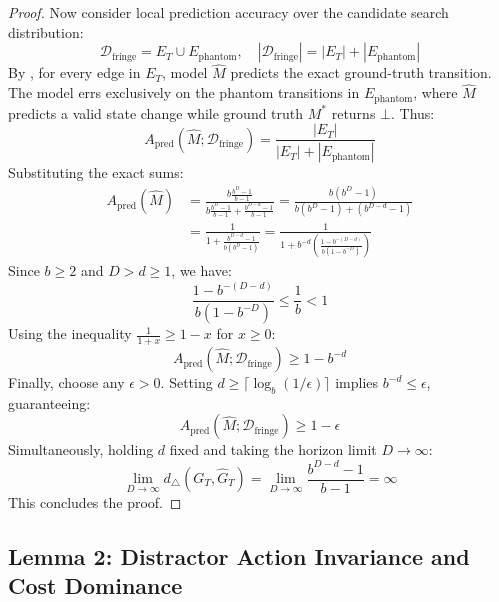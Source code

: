 \documentclass[11pt,a4paper]{article}
\theoremstyle{definition}
\theoremstyle{remark}
\begin{document}
\begin{proof}
Now consider local prediction accuracy over the candidate search distribution:
\begin{equation}
    \mathcal{D}_{\text{fringe}} = E_T \cup E_{\text{phantom}}, \quad |\mathcal{D}_{\text{fringe}}| = |E_T| + |E_{\text{phantom}}|
\end{equation}
By , for every edge in $E_T$, model $\widehat{M}$ predicts the exact ground-truth transition. The model errs exclusively on the phantom transitions in $E_{\text{phantom}}$, where $\widehat{M}$ predicts a valid state change while ground truth $M^*$ returns $\bot$.
Thus:
\begin{equation}
    A_{\text{pred}}(\widehat{M}; \mathcal{D}_{\text{fringe}}) = \frac{|E_T|}{|E_T| + |E_{\text{phantom}}|}
\end{equation}
Substituting the exact sums:
\begin{align}
    A_{\text{pred}}(\widehat{M}) &= \frac{b \frac{b^D - 1}{b - 1}}{b \frac{b^D - 1}{b - 1} + \frac{b^{D-d} - 1}{b - 1}} = \frac{b(b^D - 1)}{b(b^D - 1) + (b^{D-d} - 1)} \\
    &= \frac{1}{1 + \frac{b^{D-d} - 1}{b(b^D - 1)}} = \frac{1}{1 + b^{-d} \left( \frac{1 - b^{-(D-d)}}{b(1 - b^{-D})} \right)}
\end{align}
Since $b \ge 2$ and $D > d \ge 1$, we have:
\begin{equation}
    \frac{1 - b^{-(D-d)}}{b(1 - b^{-D})} \le \frac{1}{b} < 1
\end{equation}
Using the inequality $\frac{1}{1 + x} \ge 1 - x$ for $x \ge 0$:
\begin{equation}
    A_{\text{pred}}(\widehat{M}; \mathcal{D}_{\text{fringe}}) \ge 1 - b^{-d}
\end{equation}
Finally, choose any $\epsilon > 0$. Setting $d \ge \lceil \log_b(1/\epsilon) \rceil$ implies $b^{-d} \le \epsilon$, guaranteeing:
\begin{equation}
    A_{\text{pred}}(\widehat{M}; \mathcal{D}_{\text{fringe}}) \ge 1 - \epsilon
\end{equation}
Simultaneously, holding $d$ fixed and taking the horizon limit $D \to \infty$:
\begin{equation}
    \lim_{D \to \infty} d_\triangle(G_T, \widehat{G}_T) = \lim_{D \to \infty} \frac{b^{D-d} - 1}{b - 1} = \infty
\end{equation}
This concludes the proof.
\end{proof}

\subsection{Lemma 2: Distractor Action Invariance and Cost Dominance}
\end{document}
